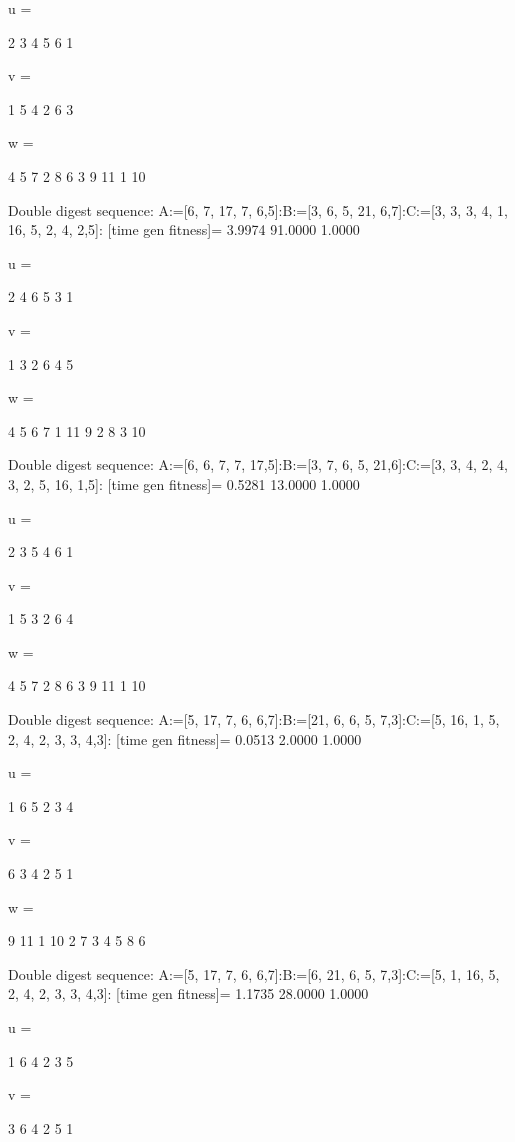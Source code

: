 u =

     2     3     4     5     6     1


v =

     1     5     4     2     6     3


w =

     4     5     7     2     8     6     3     9    11     1    10

Double digest sequence:
A:=[6, 7, 17, 7, 6,5]:B:=[3, 6, 5, 21, 6,7]:C:=[3, 3, 3, 4, 1, 16, 5, 2, 4, 2,5]:
[time gen fitness]=
    3.9974   91.0000    1.0000


u =

     2     4     6     5     3     1


v =

     1     3     2     6     4     5


w =

     4     5     6     7     1    11     9     2     8     3    10

Double digest sequence:
A:=[6, 6, 7, 7, 17,5]:B:=[3, 7, 6, 5, 21,6]:C:=[3, 3, 4, 2, 4, 3, 2, 5, 16, 1,5]:
[time gen fitness]=
    0.5281   13.0000    1.0000


u =

     2     3     5     4     6     1


v =

     1     5     3     2     6     4


w =

     4     5     7     2     8     6     3     9    11     1    10

Double digest sequence:
A:=[5, 17, 7, 6, 6,7]:B:=[21, 6, 6, 5, 7,3]:C:=[5, 16, 1, 5, 2, 4, 2, 3, 3, 4,3]:
[time gen fitness]=
    0.0513    2.0000    1.0000


u =

     1     6     5     2     3     4


v =

     6     3     4     2     5     1


w =

     9    11     1    10     2     7     3     4     5     8     6

Double digest sequence:
A:=[5, 17, 7, 6, 6,7]:B:=[6, 21, 6, 5, 7,3]:C:=[5, 1, 16, 5, 2, 4, 2, 3, 3, 4,3]:
[time gen fitness]=
    1.1735   28.0000    1.0000


u =

     1     6     4     2     3     5


v =

     3     6     4     2     5     1


